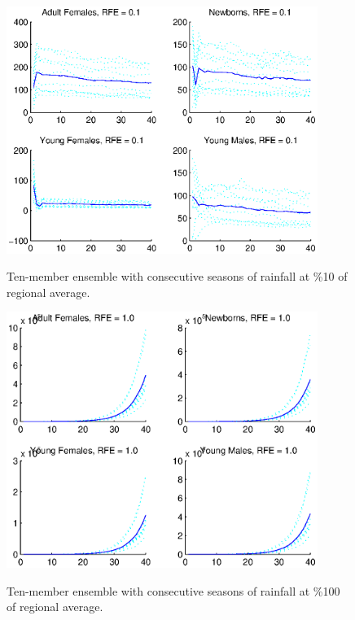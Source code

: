 \documentclass[fleqn, letterpaper]{article}
\numberwithin{figure}{section}
\begin{document}
\begin{figure}
\includegraphics[width=0.9\textwidth]{rgeneral1}
\label{rgeneral1}
\caption{Ten-member ensemble with consecutive seasons of rainfall at \%10 of regional average.}
\end{figure}
\begin{figure}
\includegraphics[width=0.9\textwidth]{rgeneral10}
\label{rgeneral10}
\caption{Ten-member ensemble with consecutive seasons of rainfall at \%100 of regional average.}
\end{figure}
\end{document}
